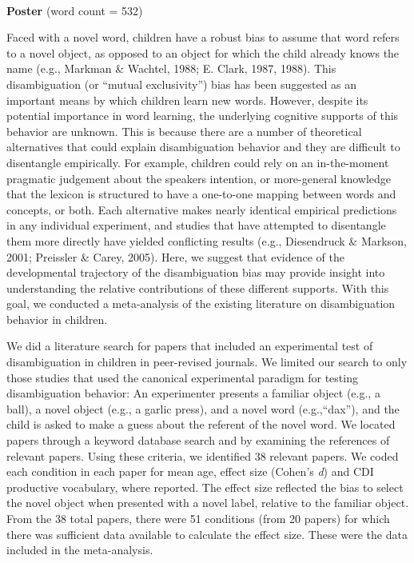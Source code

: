\documentclass[12pt]{article}
\begin{document}
\pagestyle{empty}

{}\\
{\bf Poster} (word count = 532) 

 \vspace{5mm}
 
\noindent Faced with a novel word, children have a robust bias to assume that word refers to a novel object, as opposed to an object for which the child already knows the name (e.g., Markman \& Wachtel, 1988;  E. Clark, 1987, 1988). This disambiguation (or ``mutual exclusivity'')  bias has  been suggested as an important means by which children learn new words. However, despite its potential importance in word learning, the underlying cognitive supports of this behavior are unknown. This is because there are a number of theoretical alternatives that could explain disambiguation behavior and they are difficult to disentangle empirically. For example, children could rely on an in-the-moment pragmatic judgement about the speakers intention, or more-general knowledge that the lexicon is structured to have a one-to-one mapping between words and concepts, or both. Each alternative makes nearly identical empirical predictions in any individual experiment, and studies that have attempted to  disentangle them more directly have yielded conflicting results (e.g., Diesendruck \& Markson, 2001; Preissler \& Carey, 2005). Here, we suggest that evidence of the developmental trajectory of the disambiguation bias may provide insight into understanding the relative contributions of these different supports. With this goal, we conducted a meta-analysis of the existing literature on disambiguation behavior in children.
 
We did a literature search for papers that included an experimental test of disambiguation in children in peer-revised journals. We limited our search to only those studies that used the canonical experimental paradigm for testing disambiguation behavior: An experimenter presents a familiar object (e.g., a ball), a novel object (e.g., a garlic press), and a novel word (e.g.,``dax''), and the child is  asked to make a guess about the referent of the novel word. We located papers through a keyword database search and by examining the references of relevant papers. Using these criteria, we identified 38 relevant papers. We coded each condition in each paper for mean age, effect size (Cohen's {\it d}) and CDI productive vocabulary, where reported. The effect size reflected the bias to select the novel object when presented with a novel label, relative to the familiar object. From the 38 total papers,  there were 51 conditions (from 20 papers) for which there was sufficient data available to calculate the effect size. These were the data included in the meta-analysis.
\end{document}

